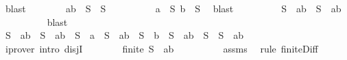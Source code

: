\begin{isabellebody}
\ blast\isanewline
\ \ \ \ \ \ \isamarkupfalse%
\ {\isachardoublequoteopen}{\isacharbraceleft}a{\isacharcomma}b{\isacharbraceright}\ {\isasymunion}\ S\ {\isacharequal}\ S{\isachardoublequoteclose}\isanewline
\ \ \ \ \ \ \ \ \isamarkupfalse%
\ {\isacartoucheopen}a\ {\isasymin}\ S{\isacartoucheclose}\ {\isacartoucheopen}b\ {\isasymin}\ S{\isacartoucheclose}\ \isamarkupfalse%
\ blast\isanewline
\ \ \ \ \ \ \isamarkupfalse%
\ \isamarkupfalse%
\ {\isachardoublequoteopen}S\ {\isacharequal}\ {\isacharbraceleft}a{\isacharcomma}b{\isacharbraceright}\ {\isasymunion}\ {\isacharparenleft}S\ {\isacharminus}\ {\isacharbraceleft}a{\isacharcomma}b{\isacharbraceright}{\isacharparenright}{\isachardoublequoteclose}\ \isanewline
\ \ \ \ \ \ \ \ \isamarkupfalse%
\ blast\isanewline
\ \ \ \ \ \ \isamarkupfalse%
\ \isamarkupfalse%
\ {}{\isacharcolon}{\isachardoublequoteopen}S\ {\isacharequal}\ {\isacharbraceleft}a{\isacharcomma}b{\isacharbraceright}\ {\isasymunion}\ {\isacharparenleft}S\ {\isacharminus}\ {\isacharbraceleft}a{\isacharcomma}b{\isacharbraceright}{\isacharparenright}\ {\isasymor}\ S\ {\isacharequal}\ {\isacharbraceleft}a{\isacharbraceright}\ {\isasymunion}\ {\isacharparenleft}S\ {\isacharminus}\ {\isacharbraceleft}a{\isacharcomma}b{\isacharbraceright}{\isacharparenright}\ {\isasymor}\ S\ {\isacharequal}\ {\isacharbraceleft}b{\isacharbraceright}\ {\isasymunion}\ {\isacharparenleft}S\ {\isacharminus}\ {\isacharbraceleft}a{\isacharcomma}b{\isacharbraceright}{\isacharparenright}\ {\isasymor}\ S\ {\isacharequal}\ {\isacharparenleft}S\ {\isacharminus}\ {\isacharbraceleft}a{\isacharcomma}b{\isacharbraceright}{\isacharparenright}{\isachardoublequoteclose}\isanewline
\ \ \ \ \ \ \ \ \isamarkupfalse%
\ {\isacharparenleft}iprover\ intro{\isacharcolon}\ disjI{}{\isacharparenright}\isanewline
\ \ \ \ \ \ \isamarkupfalse%
\ {\isachardoublequoteopen}finite\ {\isacharparenleft}S\ {\isacharminus}\ {\isacharbraceleft}a{\isacharcomma}b{\isacharbraceright}{\isacharparenright}{\isachardoublequoteclose}\isanewline
\ \ \ \ \ \ \ \ \isamarkupfalse%
\ assms{\isacharparenleft}{}{\isacharparenright}\ \isamarkupfalse%
\ {\isacharparenleft}rule\ finite{\isacharunderscore}Diff{\isacharparenright}\isanewline
\ \ \ \ \ \ \isamarkupfalse%
\ \isamarkupfalse%

\end{isabellebody}
